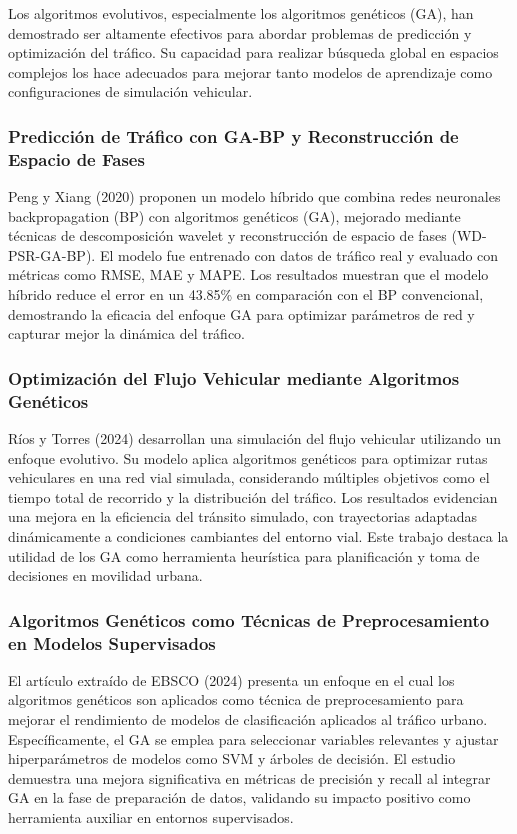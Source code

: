 \documentclass{svproc} %
\begin{document}
Los algoritmos evolutivos, especialmente los algoritmos genéticos (GA), han demostrado ser altamente efectivos para abordar problemas de predicción y optimización del tráfico. Su capacidad para realizar búsqueda global en espacios complejos los hace adecuados para mejorar tanto modelos de aprendizaje como configuraciones de simulación vehicular.

\subsubsection{Predicción de Tráfico con GA-BP y Reconstrucción de Espacio de Fases}

Peng y Xiang (2020) proponen un modelo híbrido que combina redes neuronales backpropagation (BP) con algoritmos genéticos (GA), mejorado mediante técnicas de descomposición wavelet y reconstrucción de espacio de fases (WD-PSR-GA-BP). El modelo fue entrenado con datos de tráfico real y evaluado con métricas como RMSE, MAE y MAPE. Los resultados muestran que el modelo híbrido reduce el error en un 43.85\% en comparación con el BP convencional, demostrando la eficacia del enfoque GA para optimizar parámetros de red y capturar mejor la dinámica del tráfico.

\subsubsection{Optimización del Flujo Vehicular mediante Algoritmos Genéticos}

Ríos y Torres (2024) desarrollan una simulación del flujo vehicular utilizando un enfoque evolutivo. Su modelo aplica algoritmos genéticos para optimizar rutas vehiculares en una red vial simulada, considerando múltiples objetivos como el tiempo total de recorrido y la distribución del tráfico. Los resultados evidencian una mejora en la eficiencia del tránsito simulado, con trayectorias adaptadas dinámicamente a condiciones cambiantes del entorno vial. Este trabajo destaca la utilidad de los GA como herramienta heurística para planificación y toma de decisiones en movilidad urbana.

\subsubsection{Algoritmos Genéticos como Técnicas de Preprocesamiento en Modelos Supervisados}

El artículo extraído de EBSCO (2024) presenta un enfoque en el cual los algoritmos genéticos son aplicados como técnica de preprocesamiento para mejorar el rendimiento de modelos de clasificación aplicados al tráfico urbano. Específicamente, el GA se emplea para seleccionar variables relevantes y ajustar hiperparámetros de modelos como SVM y árboles de decisión. El estudio demuestra una mejora significativa en métricas de precisión y recall al integrar GA en la fase de preparación de datos, validando su impacto positivo como herramienta auxiliar en entornos supervisados.
\end{document}
